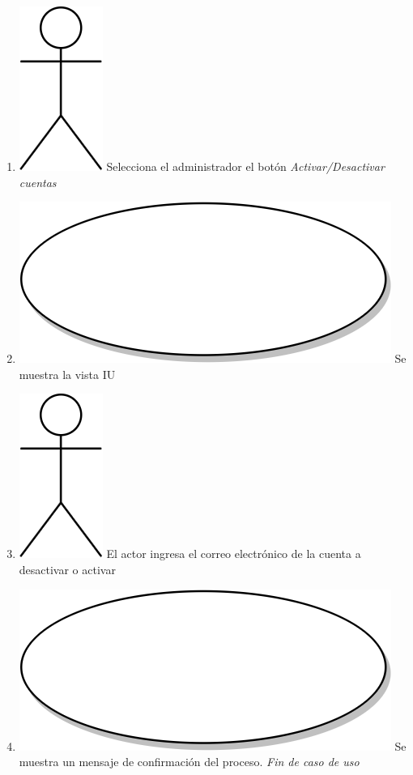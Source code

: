 \begin{enumerate}
  \item {\includegraphics[scale=.1]{Capitulo3/img/actor.png} Selecciona el administrador el botón \textit{Activar/Desactivar cuentas}}
  \item {\includegraphics[scale=.05]{Capitulo3/img/proceso.png} Se muestra la vista IU}
  \item {\includegraphics[scale=.1]{Capitulo3/img/actor.png} El actor ingresa el correo electrónico de la cuenta a desactivar o activar }
  \item {\includegraphics[scale=.05]{Capitulo3/img/proceso.png} Se muestra un mensaje de confirmación del proceso. }
  \textit{Fin de caso de uso} \\  
\end{enumerate}

